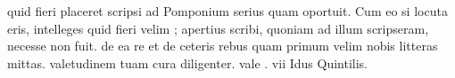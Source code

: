 


quid fieri placeret scripsi ad Pomponium serius quam oportuit.  Cum eo si locuta eris, intelleges quid fieri velim ; apertius scribi, quoniam ad illum scripseram, necesse non fuit. de ea re et de ceteris rebus quam primum velim nobis litteras mittas. valetudinem tuam cura diligenter. vale . vii Idus Quintilis.
